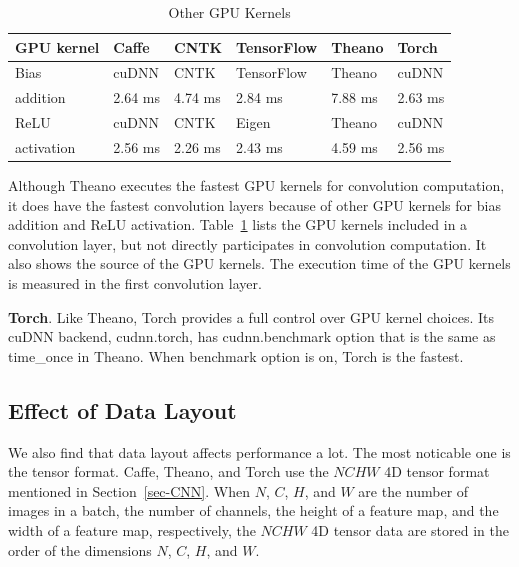 \begin{table}[htbp]
\centering
\caption{Other GPU Kernels}
\label{table_misc_kernel}
\begin{scriptsize}
\begin{tabular}{|l|l|l|l|l|l|}
\hline\hline
GPU kernel & Caffe    & CNTK    & TensorFlow & Theano  & Torch \\ \hline\hline
Bias       & cuDNN    & CNTK    & TensorFlow & Theano  & cuDNN \\ \cline{2-6} 
addition   & 2.64 ms  & 4.74 ms & 2.84 ms    & 7.88 ms & 2.63 ms  \\ \hline\hline
ReLU       & cuDNN    & CNTK    & Eigen      & Theano  & cuDNN \\ \cline{2-6}
activation & 2.56 ms  & 2.26 ms & 2.43 ms    & 4.59 ms & 2.56 ms  \\ \hline
\end{tabular}
\end{scriptsize}
\end{table}

Although Theano executes the fastest GPU kernels for convolution computation, it does have the fastest convolution layers because of other GPU kernels for bias addition and ReLU activation. Table~\ref{table_misc_kernel} lists the GPU kernels included in a convolution layer, but not directly participates in convolution computation. It also shows the source of the GPU kernels. The execution time of the GPU kernels is measured in the first convolution layer. 

{\bf Torch}. Like Theano, Torch provides a full control over GPU kernel choices. Its cuDNN backend, cudnn.torch, has \textsf{cudnn.benchmark} option that is the same as \textsf{time\_once} in Theano. When \textsf{benchmark} option is on, Torch is the fastest. 


\subsection{Effect of Data Layout}
We also find that data layout affects performance a lot. The most noticable one is the tensor format.
Caffe, Theano, and Torch use the $NCHW$ 4D tensor format mentioned in Section~\ref{sec-CNN}. When $N$, $C$, $H$, and $W$ are the number of images in a batch, the number of channels, the height of a feature map, and the width of a feature map, respectively, the $NCHW$ 4D tensor data are stored in the order of the dimensions $N$, $C$, $H$, and $W$. 

